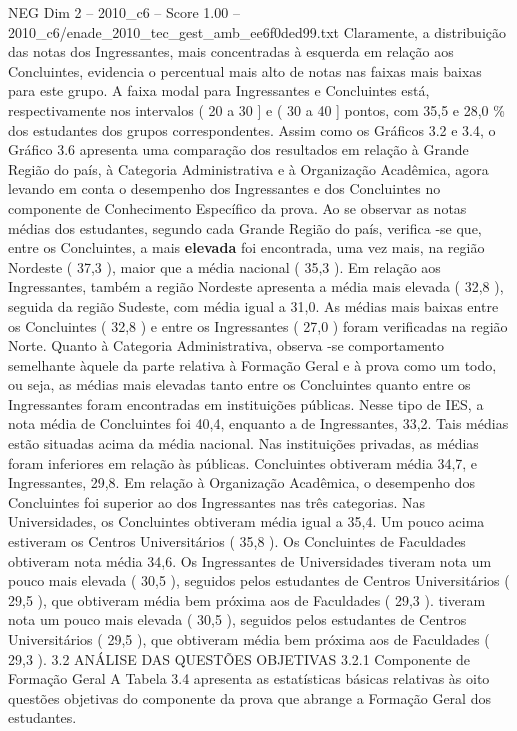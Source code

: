 \begin{textsample}{NEG Dim 2 – 2010\_c6 – Score 1.00 – 2010\_c6/enade\_2010\_tec\_gest\_amb\_ee6f0ded99.txt}
Claramente, a distribuição das notas dos Ingressantes, mais concentradas à esquerda em relação aos Concluintes, evidencia o percentual mais alto de notas nas faixas mais baixas para este grupo.
A faixa modal para Ingressantes e Concluintes está, respectivamente nos intervalos ( 20 a 30 ] e ( 30 a 40 ] pontos, com 35,5 e 28,0 \% dos estudantes dos grupos correspondentes.
Assim como os Gráficos 3.2 e 3.4, o Gráfico 3.6 apresenta uma comparação dos resultados em relação à Grande Região do país, à Categoria Administrativa e à Organização Acadêmica, agora levando em conta o desempenho dos Ingressantes e dos Concluintes no componente de Conhecimento Específico da prova.
Ao se observar as notas médias dos estudantes, segundo cada Grande Região do país, verifica -se que, entre os Concluintes, a mais \textbf{elevada} foi encontrada, uma vez mais, na região Nordeste ( 37,3 ), maior que a média nacional ( 35,3 ).
Em relação aos Ingressantes, também a região Nordeste apresenta a média mais elevada ( 32,8 ), seguida da região Sudeste, com média igual a 31,0.
As médias mais baixas entre os Concluintes ( 32,8 ) e entre os Ingressantes ( 27,0 ) foram verificadas na região Norte.
Quanto à Categoria Administrativa, observa -se comportamento semelhante àquele da parte relativa à Formação Geral e à prova como um todo, ou seja, as médias mais elevadas tanto entre os Concluintes quanto entre os Ingressantes foram encontradas em instituições públicas.
Nesse tipo de IES, a nota média de Concluintes foi 40,4, enquanto a de Ingressantes, 33,2.
Tais médias estão situadas acima da média nacional.
Nas instituições privadas, as médias foram inferiores em relação às públicas.
Concluintes obtiveram média 34,7, e Ingressantes, 29,8.
Em relação à Organização Acadêmica, o desempenho dos Concluintes foi superior ao dos Ingressantes nas três categorias.
Nas Universidades, os Concluintes obtiveram média igual a 35,4.
Um pouco acima estiveram os Centros Universitários ( 35,8 ).
Os Concluintes de Faculdades obtiveram nota média 34,6.
Os Ingressantes de Universidades tiveram nota um pouco mais elevada ( 30,5 ), seguidos pelos estudantes de Centros Universitários ( 29,5 ), que obtiveram média bem próxima aos de Faculdades ( 29,3 ). tiveram nota um pouco mais elevada ( 30,5 ), seguidos pelos estudantes de Centros Universitários ( 29,5 ), que obtiveram média bem próxima aos de Faculdades ( 29,3 ). 3.2 ANÁLISE DAS QUESTÕES OBJETIVAS 3.2.1 Componente de Formação Geral A Tabela 3.4 apresenta as estatísticas básicas relativas às oito questões objetivas do componente da prova que abrange a Formação Geral dos estudantes.

\end{textsample}
